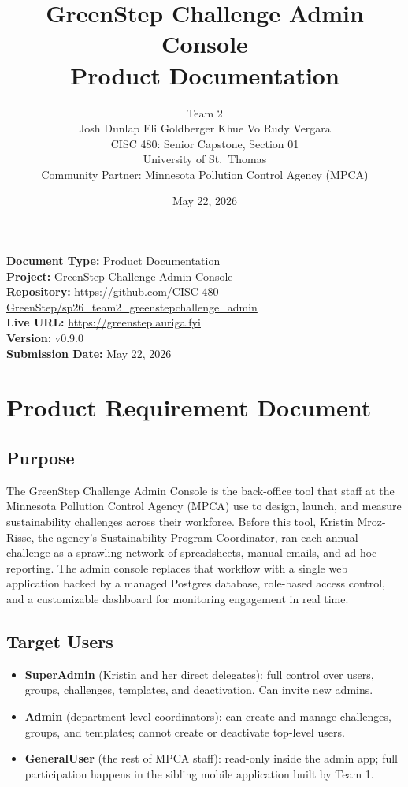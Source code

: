 \documentclass[11pt,letterpaper]{article}
\title{
  \vspace{-1cm}
  \textbf{GreenStep Challenge Admin Console} \\[0.5em]
  \large Product Documentation
}
\author{
  Team 2 \\
  Josh Dunlap \quad Eli Goldberger \quad Khue Vo \quad Rudy Vergara \\[0.5em]
  CISC 480: Senior Capstone, Section 01 \\
  University of St.\ Thomas \\
  Community Partner: Minnesota Pollution Control Agency (MPCA)
}
\date{May 22, 2026}
\begin{document}
\maketitle
\thispagestyle{empty}

\vfill
\noindent
\textbf{Document Type:} Product Documentation \\
\textbf{Project:} GreenStep Challenge Admin Console \\
\textbf{Repository:} \url{https://github.com/CISC-480-GreenStep/sp26_team2_greenstepchallenge_admin} \\
\textbf{Live URL:} \url{https://greenstep.auriga.fyi} \\
\textbf{Version:} v0.9.0 \\
\textbf{Submission Date:} May 22, 2026
\vfill
\newpage

\tableofcontents
\newpage

\section{Product Requirement Document}

\subsection{Purpose}

The GreenStep Challenge Admin Console is the back-office tool that staff
at the Minnesota Pollution Control Agency (MPCA) use to design, launch,
and measure sustainability challenges across their workforce.
Before this tool, Kristin Mroz-Risse, the agency's Sustainability Program
Coordinator, ran each annual challenge as a sprawling network of
spreadsheets, manual emails, and ad hoc reporting. The admin console
replaces that workflow with a single web application backed by a managed
Postgres database, role-based access control, and a customizable
dashboard for monitoring engagement in real time.

\subsection{Target Users}

\begin{itemize}[noitemsep]
  \item \textbf{SuperAdmin} (Kristin and her direct delegates):
        full control over users, groups, challenges, templates, and
        deactivation. Can invite new admins.
  \item \textbf{Admin} (department-level coordinators): can create and
        manage challenges, groups, and templates; cannot create or
        deactivate top-level users.
  \item \textbf{GeneralUser} (the rest of MPCA staff): read-only inside
        the admin app; full participation happens in the sibling mobile
        application built by Team 1.
\end{itemize}
\end{document}

